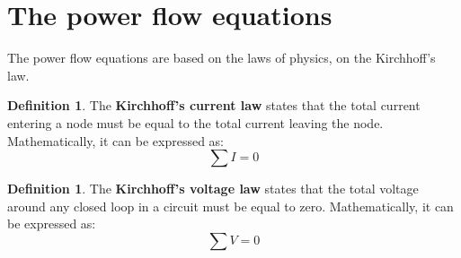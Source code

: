 \documentclass[12pt, openany]{report}
\theoremstyle{definition}
\newtheorem{definition}[thm]{Definition}
\begin{document}
\section{The power flow equations}
The power flow equations are based on the laws of physics, on the Kirchhoff's law.
\begin{definition}
    The \textbf{Kirchhoff's current law} states that the total current entering a node must be equal to the total current leaving the node. Mathematically, it can be expressed as:
    \begin{equation}
        \sum I = 0
    \end{equation}
\end{definition}
\begin{definition}
    The \textbf{Kirchhoff's voltage law} states that the total voltage around any closed loop in a circuit must be equal to zero. Mathematically, it can be expressed as:
    \begin{equation}
        \sum V = 0
    \end{equation}
\end{definition}
\end{document}
